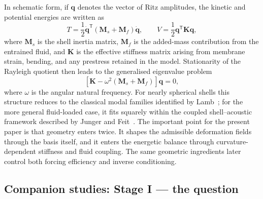 In schematic form, if $\mathbf{q}$ denotes the vector of Ritz amplitudes, the
kinetic and potential energies are written as
\begin{equation}
T = \frac{1}{2}\dot{\mathbf{q}}^{\mathsf T}
\left(\mathbf{M}_{s} + \mathbf{M}_{f}\right)\dot{\mathbf{q}},
\qquad
V = \frac{1}{2}\mathbf{q}^{\mathsf T}\mathbf{K}\mathbf{q},
\label{eq:background-energies}
\end{equation}
where $\mathbf{M}_{s}$ is the shell inertia matrix, $\mathbf{M}_{f}$ is the
added-mass contribution from the entrained fluid, and $\mathbf{K}$ is the
effective stiffness matrix arising from membrane strain, bending, and any
prestress retained in the model.  Stationarity of the Rayleigh quotient then
leads to the generalised eigenvalue problem
\begin{equation}
\left[\mathbf{K} - \omega^{2}\left(\mathbf{M}_{s} + \mathbf{M}_{f}\right)\right]
\mathbf{q} = 0,
\label{eq:background-eigenproblem}
\end{equation}
where $\omega$ is the angular natural frequency.  For nearly spherical shells
this structure reduces to the classical modal families identified by
Lamb~\cite{lamb1882}; for the more general fluid-loaded case, it fits squarely
within the coupled shell--acoustic framework described by Junger and
Feit~\cite{Junger1986}.  The important point for the present paper is that
geometry enters twice.  It shapes the admissible deformation fields through the
basis itself, and it enters the energetic balance through curvature-dependent
stiffness and fluid coupling.  The same geometric ingredients later control
both forcing efficiency and inverse conditioning.

\subsection{Companion studies: Stage I --- the question}

